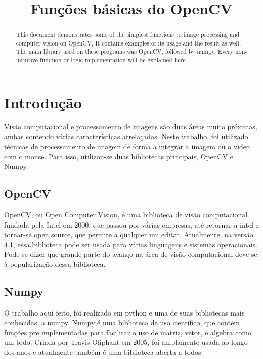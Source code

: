 \documentclass{bmvc2k}
\title{Funções básicas do OpenCV}
\begin{document}
\maketitle

\begin{abstract}
This document demonstrates some of the simplest functions to image processing and computer vision on OpenCV. It contains examples of its usage and the result as well. The main library used on these programs was OpenCV, followed by numpy. Every non-intuitive function or logic implementation will be explained here.
\end{abstract}

\section{Introdução}
\label{sec:intro}
Visão computacional e processamento de imagens são duas áreas muito próximas, ambas contendo várias características atrelaçadas. Neste trabalho, foi utilizado técnicas de processamento de imagem de forma a integrar a imagem ou o video com o mouse. Para isso, utilizou-se duas bibliotecas principais, OpenCV e Numpy. 

\subsection{OpenCV}
OpenCV, ou Open Computer Vision, é uma biblioteca de visão computacional fundada pela Intel em 2000, que passou por várias empresas, até retornar a intel e tornar-se open source, que permite a qualquer um editar. Atualmente, na versão 4.1, essa biblioteca pode ser usada para várias linguagens e sistemas operacionais. Pode-se dizer que grande parte do avanço na área de visão computacional deve-se à popularização dessa biblioteca.

 \cite{opencv_library}


\subsection{Numpy}
O trabalho aqui feito, foi realizado em python e uma de suas bibliotecas mais conhecidas, a numpy. Numpy é uma biblioteca de uso científico, que contém funções pre implementadas para facilitar o uso de matriz, vetor, e algebra como um todo. Criada por Travis Oliphant em 2005, foi amplamente usada ao longo dos anos e atualmente também é uma biblioteca aberta a todos.
\end{document}
